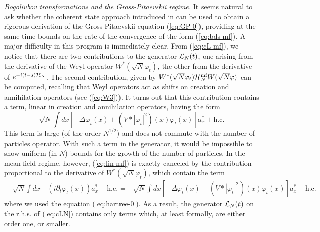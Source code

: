 \documentclass[11pt,a4paper,DIV11]{scrartcl}	%
\newcommand{\cH}{{\cal H}}
\newcommand{\cL}{{\cal L}}
\begin{document}
\bigskip

{\it Bogoliubov transformations and the Gross-Pitaevskii regime.} It seems natural to ask whether the coherent state approach introduced in \cite{RS} can be used to obtain a rigorous derivation of the Gross-Pitaevskii equation (\ref{eq:GP-0}), providing at the same time bounds on the rate of the convergence of the form (\ref{eq:bds-mf}). A major difficulty in this program is immediately clear. 
{F}rom (\ref{eq:cL-mf}), we notice that there are two contributions to the generator $\cL_N (t)$, one 
 arising from the derivative of the Weyl operator $W^* (\sqrt{N} \varphi_t)$, the other from the derivative of $e^{-i (t-s) \cH_N}$. The second contribution, given by $W^* (\sqrt{N} \varphi_t) \cH^{\text{mf}}_N W(\sqrt{N} \varphi)$ can be computed, recalling that Weyl operators act as shifts on creation and annihilation operators (see (\ref{eq:W3})). It turns out that this contribution contains a term, linear in creation and annihilation operators, having the form
\begin{equation}\label{eq:lin-mf}  \sqrt{N} \int dx \left[ -\Delta \varphi_t (x) + (V*|\varphi_t|^2) (x) \varphi_t (x) \right] a_x^* + \text{h.c.} \end{equation}
This term is large (of the order $N^{1/2}$) and does not commute with the number of particles operator. With such a term in the generator, it would be impossible to show uniform (in $N$) bounds for the growth of the number of particles. In the mean field regime, however, (\ref{eq:lin-mf}) is exactly 
canceled by the contribution proportional to the derivative of $W^* (\sqrt{N} \varphi_t)$, which contain the term
\[ \begin{split} -\sqrt{N} \int dx \, & ( i \partial_t \varphi_t (x) ) a_x^* - \text{h.c.} = -
\sqrt{N} \int dx \left[ -\Delta \varphi_t (x) + (V*|\varphi_t|^2) (x) \varphi_t (x) \right] a_x^* - \text{h.c.} 
\end{split}
\]
where we used the equation (\ref{eq:hartree-0}). As a result, the generator $\cL_N (t)$ on the r.h.s. of (\ref{eq:cLN}) contains only terms which, at least formally, are either order one, or smaller. 
\end{document}
